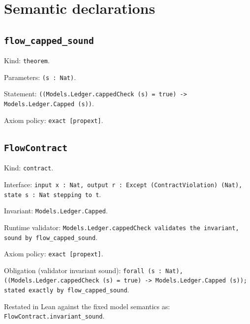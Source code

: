 \documentclass[11pt]{article}
\begin{document}
\section*{Semantic declarations}
\subsection*{\texttt{flow\_capped\_sound}}
\noindent Kind: \texttt{theorem}.\par
\noindent Parameters: \texttt{(s : Nat)}.\par
\noindent Statement: \texttt{((Models.Ledger.cappedCheck (s) = true) -> Models.Ledger.Capped (s))}.\par
\noindent Axiom policy: \texttt{exact [propext]}.\par
\subsection*{\texttt{FlowContract}}
\noindent Kind: \texttt{contract}.\par
\noindent Interface: \texttt{input x : Nat, output r : Except (ContractViolation) (Nat), state s : Nat stepping to t}.\par
\noindent Invariant: \texttt{Models.Ledger.Capped}.\par
\noindent Runtime validator: \texttt{Models.Ledger.cappedCheck validates the invariant, sound by flow\_capped\_sound}.\par
\noindent Axiom policy: \texttt{exact [propext]}.\par
\noindent Obligation (validator invariant sound): \texttt{forall (s : Nat), ((Models.Ledger.cappedCheck (s) = true) -> Models.Ledger.Capped (s)); stated exactly by flow\_capped\_sound}.\par
\noindent Restated in Lean against the fixed model semantics as: \texttt{FlowContract.invariant\_sound}.\par
\end{document}
